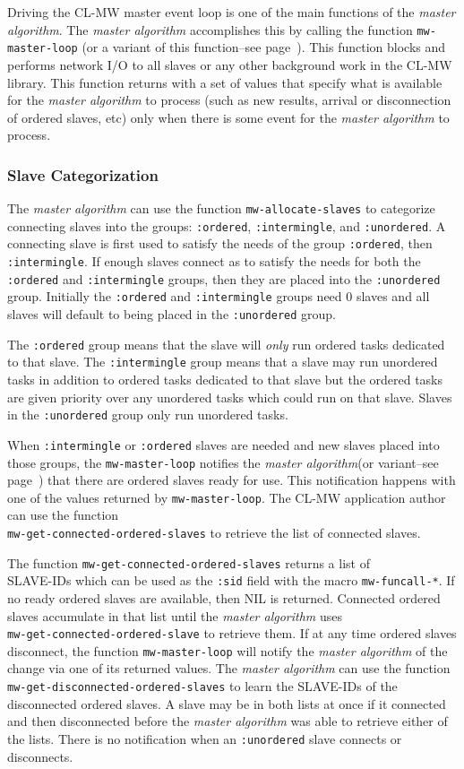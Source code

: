 \documentclass[titlepage,12pt]{book}
\newcommand{\xsmall}{\latexhtml{\small}{}}
\newcommand{\xnormalsize}{\latexhtml{\normalsize}{}}
\newcommand{\clmw}{\xsmall\textsc{CL-MW}\xnormalsize\xspace}
\newcommand{\ma}{\textit{master algorithm}\xspace}
\newcommand{\un}{\texttt{:unordered}\xspace}
\newcommand{\inter}{\texttt{:intermingle}\xspace}
\newcommand{\ord}{\texttt{:ordered}\xspace}
\newcommand{\func}[1]{\mbox{\texttt{#1}}\xspace}
\newcommand{\macro}[1]{\mbox{\texttt{#1}}\xspace}
\begin{document}
Driving the \clmw master event loop is one of the main functions
of the \ma. The \ma accomplishes this by calling the function
\func{mw-master-loop} (or a variant of this function--see
page~\pageref{master-algorithm-api}). This function blocks and performs
network I/O to all slaves or any other background work in the \clmw
library. This function returns with a set of values that specify what
is available for the \ma to process (such as new results, arrival
or disconnection of ordered slaves, etc) only when there is some
event for the \ma to process.

\subsubsection{Slave Categorization}

The \ma can use the function \func{mw-allocate-slaves} to categorize
connecting slaves into the groups: \ord, \inter, and \un.  A connecting
slave is first used to satisfy the needs of the group \ord, then
\inter.  If enough slaves connect as to satisfy the needs for both
the \ord and \inter groups, then they are placed into the \un group.
Initially the \ord and \inter groups need 0 slaves and all slaves will
default to being placed in the \un group.

The \ord group means that the slave will \emph{only} run ordered tasks
dedicated to that slave. The \inter group means that a slave may run
unordered tasks in addition to ordered tasks dedicated to that slave
but the ordered tasks are given priority over any unordered tasks
which could run on that slave. Slaves in the \un group only run
unordered tasks.

When \inter or \ord slaves are needed and new slaves placed into
those groups, the \func{mw-master-loop} notifies the \ma (or
variant--see page~\pageref{master-algorithm-api}) that there are
ordered slaves ready for use. This notification happens with one of
the values returned by \func{mw-master-loop}. The \clmw application
author can use the function \\ \func{mw-get-connected-ordered-slaves} to
retrieve the list of connected slaves.

The function \func{mw-get-connected-ordered-slaves} returns a list
of \\ SLAVE-IDs which can be used as the \texttt{:sid} field with the
macro \macro{mw-funcall-*}.  If no ready ordered slaves are available,
then NIL is returned. Connected ordered slaves accumulate in that
list until the \ma uses \\ \func{mw-get-connected-ordered-slave}
to retrieve them.  If at any time ordered slaves disconnect, the
function \func{mw-master-loop} will notify the \ma of the change
via one of its returned values.  The \ma can use the function
\func{mw-get-disconnected-ordered-slaves} to learn the SLAVE-IDs
of the disconnected ordered slaves. A slave may be in both lists at
once if it connected and then disconnected before the \ma was able
to retrieve either of the lists. There is no notification when an
\un slave connects or disconnects.
\end{document}
